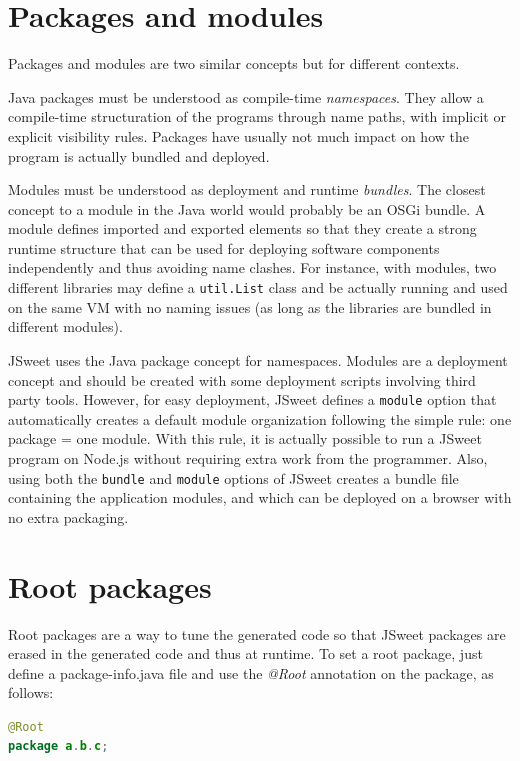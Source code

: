 \documentclass[a4paper]{report}
\begin{document}
\section{Packages and modules}

Packages and modules are two similar concepts but for different contexts.

Java packages must be understood as compile-time \emph{namespaces}. They allow a compile-time structuration of the programs through name paths, with implicit or explicit visibility rules. Packages have usually not much impact on how the program is actually bundled and deployed.

Modules must be understood as deployment and runtime \emph{bundles}. The closest concept to a module in the Java world would probably be an OSGi bundle. A module defines imported and exported elements so that they create a strong runtime structure that can be used for deploying software components independently and thus avoiding name clashes. For instance, with modules, two different libraries may define a \texttt{util.List} class and be actually running and used on the same VM with no naming issues (as long as the libraries are bundled in different modules).

JSweet uses the Java package concept for namespaces. Modules are a deployment concept and should be created with some deployment scripts involving third party tools. However, for easy deployment, JSweet defines a \texttt{module} option that automatically creates a default module organization following the simple rule: one package = one module. With this rule, it is actually possible to run a JSweet program on Node.js without requiring extra work from the programmer. Also, using both the \texttt{bundle} and \texttt{module} options of JSweet creates a bundle file containing the application modules, and which can be deployed on a browser with no extra packaging.

\section{Root packages}

Root packages are a way to tune the generated code so that JSweet packages are erased in the generated code and thus at runtime. To set a root package, just define a package-info.java file and use the \emph{@Root} annotation on the package, as follows:

\begin{lstlisting}[language=Java]
@Root
package a.b.c;
\end{lstlisting}
\end{document}
